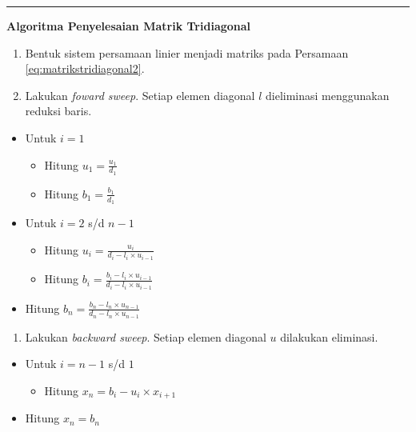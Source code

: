 \documentclass[
]{book}
\providecommand{\tightlist}{%
  \setlength{\itemsep}{0pt}\setlength{\parskip}{0pt}}
\theoremstyle{definition}
\theoremstyle{definition}
\theoremstyle{definition}
\theoremstyle{definition}
\theoremstyle{remark}
\begin{document}
\begin{center}\rule{0.5\linewidth}{0.5pt}\end{center}

\textbf{Algoritma Penyelesaian Matrik Tridiagonal}

\begin{enumerate}
\def\labelenumi{\arabic{enumi}.}
\tightlist
\item
  Bentuk sistem persamaan linier menjadi matriks pada Persamaan \eqref{eq:matrikstridiagonal2}.
\item
  Lakukan \emph{foward sweep}. Setiap elemen diagonal \(l\) dieliminasi menggunakan reduksi baris.
\end{enumerate}

\begin{itemize}
\item
  Untuk \(i=1\)

  \begin{itemize}
  \tightlist
  \item
    Hitung \(u_1=\frac{u_1}{d_1}\)
  \item
    Hitung \(b_1=\frac{b_1}{d_1}\)
  \end{itemize}
\item
  Untuk \(i=2\) s/d \(n-1\)

  \begin{itemize}
  \tightlist
  \item
    Hitung \(u_i=\frac{u_i}{d_i-l_i\times u_{i-1}}\)
  \item
    Hitung \(b_i=\frac{b_i-l_i\times u_{i-1}}{d_i-l_i\times u_{i-1}}\)
  \end{itemize}
\item
  Hitung \(b_n=\frac{b_n-l_n\times u_{n-1}}{d_n-l_n\times u_{n-1}}\)
\end{itemize}

\begin{enumerate}
\def\labelenumi{\arabic{enumi}.}
\setcounter{enumi}{2}
\tightlist
\item
  Lakukan \emph{backward sweep}. Setiap elemen diagonal \(u\) dilakukan eliminasi.
\end{enumerate}

\begin{itemize}
\item
  Untuk \(i=n-1\) s/d \(1\)

  \begin{itemize}
  \tightlist
  \item
    Hitung \(x_n=b_i-u_i\times x_{i+1}\)
  \end{itemize}
\item
  Hitung \(x_n=b_n\)
\end{itemize}
\end{document}
